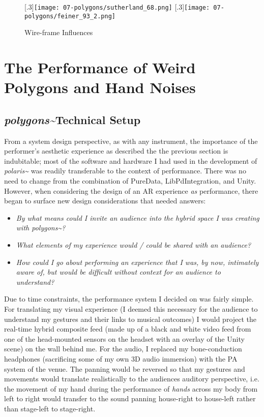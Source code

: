 \begin{figure}
    \centering
    [.3\linewidth]{\texttt{[image: 07-polygons/sutherland\_68.png]}}
    [.3\linewidth]{\texttt{[image: 07-polygons/feiner\_93\_2.png]}}%
    \caption{Wire-frame Influences}
    \label{fig: polygons-wireframes}
\end{figure}


\section{The Performance of Weird Polygons and Hand Noises} \label{sec: polygons-performances}
\subsection{\textit{polygons\textasciitilde{}}Technical Setup} \label{sec: polygons-performances-setup}
From a system design perspective, as with any instrument, the importance of the performer's aesthetic experience as described the the previous section is indubitable; most of the software and hardware I had used in the development of \textit{polaris\textasciitilde{}} was readily transferable to the context of performance. There was no need to change from the combination of PureData, LibPdIntegration, and Unity. However, when considering the design of an AR experience \textit{as} performance, there began to surface new design considerations that needed answers:
\begin{itemize}
    \item \textit{By what means could I invite an audience into the hybrid space I was creating with \textit{polygons\textasciitilde{}}?} 
    \item \textit{What elements of my experience would / could be shared with an audience?} 
    \item \textit{How could I go about performing an experience that I was, by now, intimately aware of, but would be difficult without context for an audience to understand?} 
\end{itemize}
Due to time constraints, the performance system I decided on was fairly simple. For translating my visual experience (I deemed this necessary for the audience to understand my gestures and their links to musical outcomes) I would project the real-time hybrid composite feed (made up of a black and white video feed from one of the head-mounted sensors on the headset with an overlay of the Unity scene) on the wall behind me. For the audio, I replaced my bone-conduction headphones (sacrificing some of my own 3D audio immersion) with the PA system of the venue. The panning would be reversed so that my gestures and movements would translate realistically to the audiences auditory perspective, i.e. the movement of my hand during the performance of \textit{hands} across my body from left to right would transfer to the sound panning house-right to house-left rather than stage-left to stage-right.


